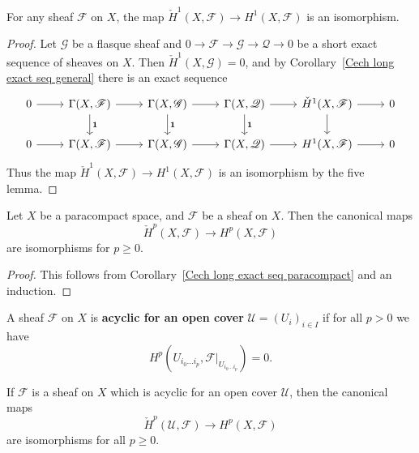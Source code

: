 \begin{corollary}\label{Cech H^1}
For any sheaf $\mathscr{F}$ on $X$, the map $\check{H}^1(X,\mathscr{F})\to H^1(X,\mathscr{F})$ is an isomorphism.
\end{corollary}
\begin{proof}
Let $\mathscr{G}$ be a flasque sheaf and $0\to\mathscr{F}\to\mathscr{G}\to\mathscr{Q}\to 0$ be a short exact sequence of sheaves on $X$. Then $\check{H}^1(X,\mathscr{G})=0$, and by Corollary~\ref{Cech long exact seq general} there is an exact sequence
\[\begin{tikzcd}
0\ar[r]&\Gamma(X,\mathscr{F})\ar[r]\ar[d,"\mathbf{1}"]&\Gamma(X,\mathscr{G})\ar[r]\ar[d,"\mathbf{1}"]&\Gamma(X,\mathscr{Q})\ar[r]\ar[d,"\mathbf{1}"]&\check{H}^1(X,\mathscr{F})\ar[r]\ar[d]&0\\
0\ar[r]&\Gamma(X,\mathscr{F})\ar[r]&\Gamma(X,\mathscr{G})\ar[r]&\Gamma(X,\mathscr{Q})\ar[r]&H^1(X,\mathscr{F})\ar[r]&0
\end{tikzcd}\]
Thus the map $\check{H}^1(X,\mathscr{F})\to H^1(X,\mathscr{F})$ is an isomorphism by the five lemma.
\end{proof}
\begin{proposition}
Let $X$ be a paracompact space, and $\mathscr{F}$ be a sheaf on $X$. Then the canonical maps
\[\check{H}^p(X,\mathscr{F})\to H^p(X,\mathscr{F})\]
are isomorphisms for $p\geq 0$.
\end{proposition}
\begin{proof}
This follows from Corollary~\ref{Cech long exact seq paracompact} and an induction.
\end{proof}
\begin{definition}
A sheaf $\mathscr{F}$ on $X$ is \textbf{acyclic for an open cover} $\mathcal{U}=(U_i)_{i\in I}$ if for all $p>0$ we have
\[H^p(U_{i_0\dots i_p},\mathscr{F}|_{U_{i_0\dots i_p}})=0.\]
\end{definition}
\begin{theorem}\label{Leray acyclic thm}
If $\mathscr{F}$ is a sheaf on $X$ which is acyclic for an open cover $\mathcal{U}$, then the canonical maps
\[\check{H}^p(\mathcal{U},\mathscr{F})\to H^p(X,\mathscr{F})\]
are isomorphisms for all $p\geq 0$.
\end{theorem}
